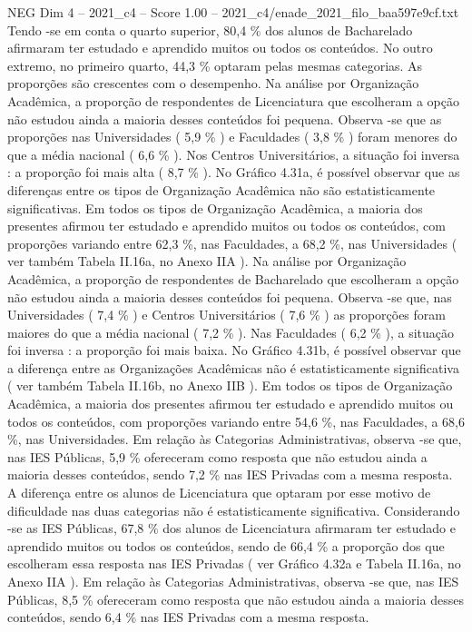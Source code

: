 \begin{textsample}{NEG Dim 4 – 2021\_c4 – Score 1.00 – 2021\_c4/enade\_2021\_filo\_baa597e9cf.txt}
Tendo -se em conta o quarto superior, 80,4 \% dos alunos de Bacharelado afirmaram ter estudado e aprendido muitos ou todos os conteúdos.
No outro extremo, no primeiro quarto, 44,3 \% optaram pelas mesmas categorias.
As proporções são crescentes com o desempenho.
Na análise por Organização Acadêmica, a proporção de respondentes de Licenciatura que escolheram a opção não estudou ainda a maioria desses conteúdos foi pequena.
Observa -se que as proporções nas Universidades ( 5,9 \% ) e Faculdades ( 3,8 \% ) foram menores do que a média nacional ( 6,6 \% ).
Nos Centros Universitários, a situação foi inversa : a proporção foi mais alta ( 8,7 \% ).
No Gráfico 4.31a, é possível observar que as diferenças entre os tipos de Organização Acadêmica não são estatisticamente significativas.
Em todos os tipos de Organização Acadêmica, a maioria dos presentes afirmou ter estudado e aprendido muitos ou todos os conteúdos, com proporções variando entre 62,3 \%, nas Faculdades, a 68,2 \%, nas Universidades ( ver também Tabela II.16a, no Anexo IIA ).
Na análise por Organização Acadêmica, a proporção de respondentes de Bacharelado que escolheram a opção não estudou ainda a maioria desses conteúdos foi pequena.
Observa -se que, nas Universidades ( 7,4 \% ) e Centros Universitários ( 7,6 \% ) as proporções foram maiores do que a média nacional ( 7,2 \% ).
Nas Faculdades ( 6,2 \% ), a situação foi inversa : a proporção foi mais baixa.
No Gráfico 4.31b, é possível observar que a diferença entre as Organizações Acadêmicas não é estatisticamente significativa ( ver também Tabela II.16b, no Anexo IIB ).
Em todos os tipos de Organização Acadêmica, a maioria dos presentes afirmou ter estudado e aprendido muitos ou todos os conteúdos, com proporções variando entre 54,6 \%, nas Faculdades, a 68,6 \%, nas Universidades.
Em relação às Categorias Administrativas, observa -se que, nas IES Públicas, 5,9 \% ofereceram como resposta que não estudou ainda a maioria desses conteúdos, sendo 7,2 \% nas IES Privadas com a mesma resposta.
A diferença entre os alunos de Licenciatura que optaram por esse motivo de dificuldade nas duas categorias não é estatisticamente significativa.
Considerando -se as IES Públicas, 67,8 \% dos alunos de Licenciatura afirmaram ter estudado e aprendido muitos ou todos os conteúdos, sendo de 66,4 \% a proporção dos que escolheram essa resposta nas IES Privadas ( ver Gráfico 4.32a e Tabela II.16a, no Anexo IIA ).
Em relação às Categorias Administrativas, observa -se que, nas IES Públicas, 8,5 \% ofereceram como resposta que não estudou ainda a maioria desses conteúdos, sendo 6,4 \% nas IES Privadas com a mesma resposta.

\end{textsample}
